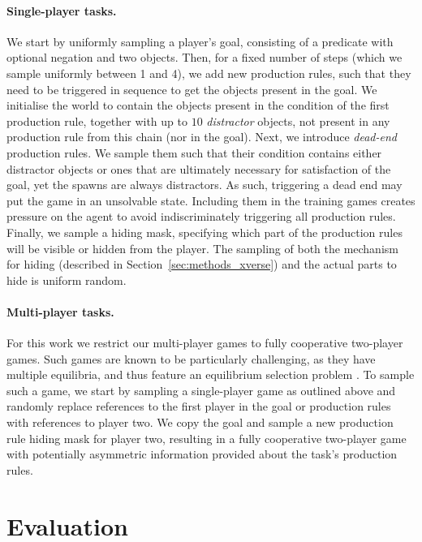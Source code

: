 \documentclass[11pt, a4paper, logo, copyright]{deepmind}
\begin{document}
\begin{appendix}
\paragraph{Single-player tasks.} We start by uniformly sampling a player's goal, consisting of a predicate with optional negation and two objects. Then, for a fixed number of steps (which we sample uniformly between 1 and 4), we add new production rules, such that they need to be triggered in sequence to get the objects present in the goal. We initialise the world to contain the objects present in the condition of the first production rule, together with up to $10$ \textit{distractor} objects, not present in any production rule from this chain (nor in the goal).
Next, we introduce {\it dead-end} production rules. We sample them such that their condition contains either distractor objects or ones that are ultimately necessary for satisfaction of the goal, yet the spawns are always distractors. As such, triggering a dead end may put the game in an unsolvable state. Including them in the training games creates pressure on the agent to avoid indiscriminately triggering all production rules. Finally, we sample a hiding mask, specifying which part of the production rules will be visible or hidden from the player. The sampling of both the mechanism for hiding (described in Section~\ref{sec:methods_xverse}) and the actual parts to hide is uniform random.
\paragraph{Multi-player tasks.} For this work we restrict our multi-player games to fully cooperative two-player games. Such games are known to be particularly challenging, as they have multiple equilibria, and thus feature an equilibrium selection problem \citep{DBLP:journals/corr/abs-2012-08630}. To sample such a game, we start by sampling a single-player game as outlined above and randomly replace references to the first player in the goal or production rules with references to player two. We copy the goal and sample a new production rule hiding mask for player two, resulting in a fully cooperative two-player game with potentially asymmetric information provided about the task's production rules.
\section{Evaluation} \label{sec:methods_evaluation}\label{app:evaluation}

\end{appendix}
\end{document}
